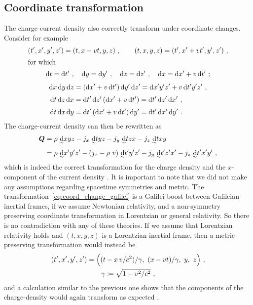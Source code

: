 \documentclass[\ifafour a4paper,12pt,\else a5paper,10pt,\fi%
onecolumn,oneside,article,%
british%
]{memoir}
\theoremstyle{remark}
\theoremstyle{innote}
\newcommand*{\di}{\mathrm{d}}%
\newcommand*{\defd}{\coloneqq}
\renewcommand*{\|}[1][]{\nonscript\:#1\vert\nonscript\:\mathopen{}}
\newcommand*{\eqn}{eq.}%
\newcommand*{\eqns}{eqs}%
\newcommand*{\tw}[2][\scriptstyle\sim]{\smash[b]{\underset{\mathclap{{}^{#1}}}{#2}}}
\newcommand*{\ti}[1][\scriptstyle\sim]{\tw[#1]{\di}}
\begin{document}
\subsection{Coordinate transformation}
\label{sec:charge_coords}

The charge-current density also correctly transform under coordinate changes. Consider for example
\begin{gather}
  \label{eq:coord_change_galilei}
  (t', x', y', z') = (t, x-vt, y, z) \ ,
  \qquad
  (t, x, y, z) = (t', x'+vt', y', z') \ ,
  \\
  \shortintertext{for which}
  \begin{gathered}
  \di t = \di t' \ , \quad
  \di y = \di y' \ , \quad
  \di z = \di z' \ , \quad
  \di x = \di x' + v\,\di t' \ ;
\end{gathered}
\\[\jot]
\begin{aligned}
  \di x\, \di y\, \di z &=
  (\di x' + v\,\di t')\,\di y'\,\di z' =
  \di x'y'z' + v\,\di t'y'z' \ ,
  \\[\jot]
  \di t\, \di z\, \di x &=
  \di t'\, \di z'\, (\di x' + v\,\di t') =
  \di t'\, \di z'\, \di x' \ ,
  \\[\jot]
  \di t\, \di x\, \di y &=
  \di t'\, (\di x' + v\,\di t')\, \di y' =
  \di t'\, \di x'\, \di y' \ .
\end{aligned}
\end{gather}
The charge-current density can then be rewritten as
\begin{equation}
  \label{eq:charge-current_coordtransf}
  \begin{split}
\bm{Q} &=  \rho\ \ti xyz
  - j_{x}\ \ti tyz - j_{y}\ \ti tzx - j_{z}\ \ti txy
  \\[2\jot]
  &=\rho\ \ti x'y'z'
  - (j_{x} - \rho\ v)\ \ti t'y'z'
  - j_{y}\ \ti t'z'x' - j_{z}\ \ti t'x'y' \ ,
\end{split}
\end{equation}
which is indeed the correct transformation for the charge density and the $x$-component of the current density \autocites[\eqn~(5.8)]{kovetz2000}. It is important to note that we did not make any assumptions regarding spacetime symmetries and metric. The transformation~\eqref{eq:coord_change_galilei} is a Galilei boost between Galileian inertial frames, if we assume Newtonian relativity, and a non-symmetry preserving coordinate transformation in Lorentzian or general relativity. So there is no contradiction with any of these theories. If we assume that Lorentzian relativity holds and $(t,x,y,z)$ is a Lorentzian inertial frame, then a metric-preserving transformation would instead be
\begin{equation}
  \label{eq:coord_charge_lorentz}
  \begin{gathered}
  (t', x', y', z') =
  \Bigl((t-x\,v/c^{2})/\gamma,\ (x-vt)/\gamma,\ y,\ z \Bigr) \ ,
  \\ \gamma \defd \sqrt{1-v^{2}/c^{2}}\ ,
\end{gathered}
\end{equation}
and a calculation similar to the previous one shows that the components of the charge-density would again transform as expected  \autocites[\eqns~(12.17)--(12.18)]{kovetz2000}.
\end{document}
